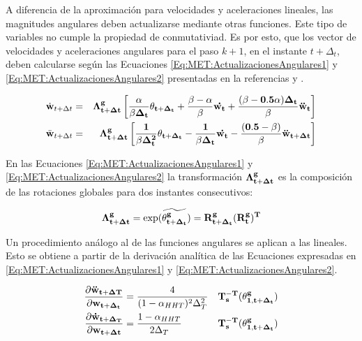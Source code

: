 A diferencia de la aproximación para velocidades y aceleraciones lineales, las magnitudes angulares deben actualizarse mediante otras funciones. Este tipo de variables no cumple la propiedad de conmutativiad. Es por esto, que los vector de velocidades y aceleraciones angulares para el paso $k+1$, en el instante $t+\Delta_t$, deben calcularse según  las Ecuaciones \eqref{Eq:MET:ActualizacionesAngulares1} y \eqref{Eq:MET:ActualizacionesAngulares2} presentadas en la referencias \citep{ibrahimbegovic1998finite} y \citep{ibrahimbegovic2002energy}. %


 \begin{eqnarray}\label{Eq:MET:ActualizacionesAngulares1}
 	\dot{\bf{w}}_{t+\Delta t}&=&\bf{\Lambda}_{t+\Delta
 		t}^g\left[\frac{\alpha}{\beta\Delta_t}\bf{\theta}_{t+\Delta_t}+
 	\frac{\beta-\alpha}{\beta}\bf{\dot{w_t}+\frac{(\beta-0.5\alpha)\Delta_t}{\beta}}
 	\ddot{\bf{w}}_{t} \right ]\\\label{Eq:MET:ActualizacionesAngulares2}
 	\ddot{\bf{w}}_{t+\Delta t}&=&\bf{\Lambda}_{t+\Delta
 		t}^g\left[\frac{1}{\beta\Delta_t^2}\bf{\theta}_{t+\Delta_t}-
 	\frac{1}{\beta\Delta_t}\bf{\dot{w_t}-\frac{(0.5-\beta)}{\beta}}
 	\ddot{\bf{w}}_{t+\Delta t} \right ]
 \end{eqnarray}

En las Ecuaciones \eqref{Eq:MET:ActualizacionesAngulares1} y \eqref{Eq:MET:ActualizacionesAngulares2} la transformación $\bf{\Lambda}_{t+\Delta t}^g$ es la composición de las rotaciones globales para dos instantes consecutivos: 

\begin{equation}\label{Eq:Met:CalculodeLamda}
	\bf{\Lambda}_{t+\Delta
		t}^g=\exp({\widetilde{\bf{\theta_{t+\Delta_t}^g}}})=\bf{R}^g_{t+\Delta_t}(\bf{R}^g_{t})^T
\end{equation}

Un procedimiento análogo al de las funciones angulares se aplican a las lineales. Esto se obtiene a partir de la derivación analítica de las Ecuaciones expresadas en \eqref{Eq:MET:ActualizacionesAngulares1} y \eqref{Eq:MET:ActualizacionesAngulares2}.

\begin{eqnarray}
	\label{Eq:MET:DerivadasAngulares1}
	\frac{\partial \bf{\ddot{w}_{t+\Delta T}}}{\partial \bf{{w}_{t+\Delta_t}}}& = 
	\frac{4}{(1-\alpha_{HHT})^2 \Delta_T^2}&  \bf{T_s^{-T}}(\bf{\theta^g_{1,{t+\Delta_t}}})\\
	\label{Eq:MET:DerivadasAngulares2}
	\frac{\partial \bf{\dot{w}_{t+\Delta_T}}}{\partial \bf{{w}_{t+\Delta t}}}& = 
	\frac{1-\alpha_{HHT}}{2\Delta_T}& \bf{T_s^{-T}}(\bf{\theta^g_{1,{t+\Delta_t}}})
\end{eqnarray}

